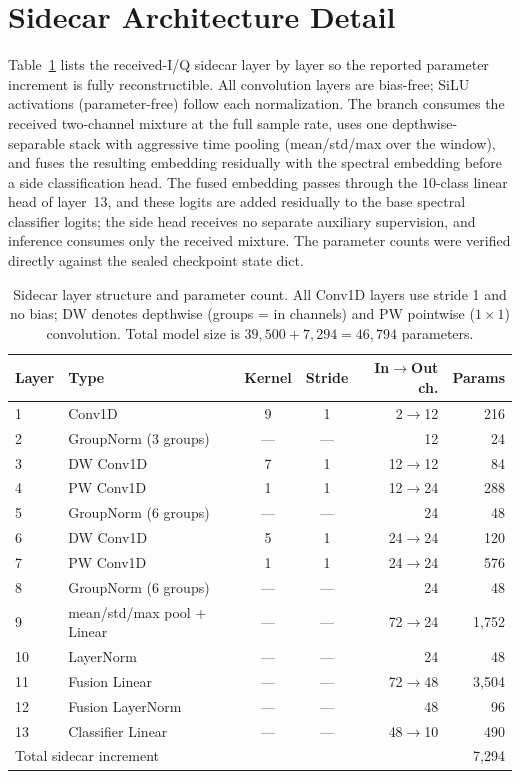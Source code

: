 \documentclass[letterpaper,onecolumn,11pt,journal]{IEEEtran}
\begin{document}
\section{Sidecar Architecture Detail}
Table~\ref{tab:sidecar} lists the received-I/Q sidecar layer by layer so the
reported parameter increment is fully reconstructible. All convolution layers
are bias-free; SiLU activations (parameter-free) follow each normalization.
The branch consumes the received two-channel mixture at the full sample rate,
uses one depthwise-separable stack with aggressive time pooling
(mean/std/max over the window), and fuses the resulting embedding residually
with the spectral embedding before a side classification head. The fused
embedding passes through the 10-class linear head of layer~13, and these
logits are added residually to the base spectral classifier logits; the side
head receives no separate auxiliary supervision, and inference consumes only
the received mixture. The parameter
counts were verified directly against the sealed checkpoint state dict.

\begin{table}[t]
\centering
\caption{Sidecar layer structure and parameter count. All Conv1D layers use
stride 1 and no bias; DW denotes depthwise (groups = in channels) and PW
pointwise ($1\times1$) convolution. Total model size is $39{,}500+7{,}294=
46{,}794$ parameters.}
\label{tab:sidecar}
\footnotesize
\setlength{\tabcolsep}{4pt}
\begin{tabular}{llccrr}
\toprule
Layer & Type & Kernel & Stride & In$\to$Out ch. & Params\\
\midrule
1 & Conv1D & 9 & 1 & 2$\to$12 & 216\\
2 & GroupNorm (3 groups) & --- & --- & 12 & 24\\
3 & DW Conv1D & 7 & 1 & 12$\to$12 & 84\\
4 & PW Conv1D & 1 & 1 & 12$\to$24 & 288\\
5 & GroupNorm (6 groups) & --- & --- & 24 & 48\\
6 & DW Conv1D & 5 & 1 & 24$\to$24 & 120\\
7 & PW Conv1D & 1 & 1 & 24$\to$24 & 576\\
8 & GroupNorm (6 groups) & --- & --- & 24 & 48\\
9 & mean/std/max pool + Linear & --- & --- & 72$\to$24 & 1{,}752\\
10 & LayerNorm & --- & --- & 24 & 48\\
11 & Fusion Linear & --- & --- & 72$\to$48 & 3{,}504\\
12 & Fusion LayerNorm & --- & --- & 48 & 96\\
13 & Classifier Linear & --- & --- & 48$\to$10 & 490\\
\midrule
\multicolumn{5}{l}{Total sidecar increment} & 7{,}294\\
\bottomrule
\end{tabular}
\end{table}
\end{document}
